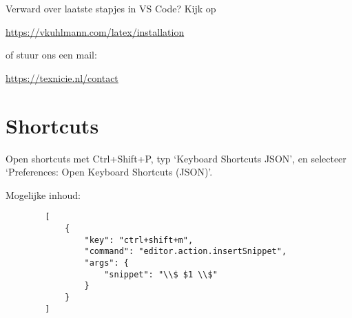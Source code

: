 \documentclass[
    dutch,
    everyoneauthor=true,
    darktheme,
    defaultSlideCollection=vincent,
    handout
]{../../cursuspresentatie}
\let\placetarget\relax
\let\placetarget\relax
\begin{document}




\begin{frame}
    \begin{center}
        \large
        Verward over laatste stapjes in VS Code?
        Kijk op 
        
        \url{https://vkuhlmann.com/latex/installation}
        
        of stuur ons een mail:
        
        \url{https://texnicie.nl/contact}
    \end{center}
\end{frame}


\section{Shortcuts}

\def\placetarget{\hypertarget{shortcuts}{}}

\begin{frame}[fragile]
    Open shortcuts met Ctrl+Shift+P, typ `Keyboard Shortcuts JSON', en selecteer
    `Preferences: Open Keyboard Shortcuts (JSON)'.


    Mogelijke inhoud:
    \begin{verbatim}
        [
            {
                "key": "ctrl+shift+m",
                "command": "editor.action.insertSnippet",
                "args": {
                    "snippet": "\\$ $1 \\$"
                }
            }
        ]
    \end{verbatim}
\end{frame}
\end{document}

